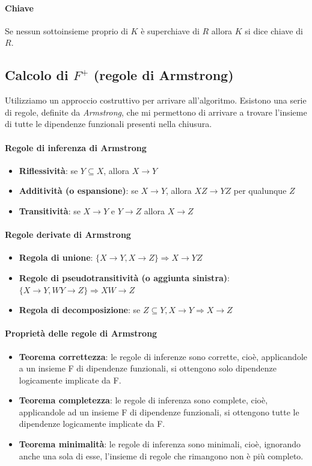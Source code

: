 \paragraph{Chiave} Se nessun sottoinsieme proprio di $K$ è superchiave di $R$ allora $K$ si dice chiave di $R$.
\subsection{Calcolo di $F^{+}$ (regole di Armstrong)}
Utilizziamo un approccio costruttivo per arrivare all'algoritmo. Esistono una serie di regole, definite da \emph{Armstrong}, che mi permettono di arrivare a trovare l'insieme di tutte le dipendenze funzionali presenti nella chiusura.
\paragraph{Regole di inferenza di Armstrong}
\begin{itemize}
	\item \textbf{Riflessività}: se $Y \subseteq X$, allora $X \to Y$
	\item \textbf{Additività (o espansione)}: se $X \to Y$, allora $XZ \to YZ$ per qualunque $Z$
	\item \textbf{Transitività}: se $X \to Y$ e $Y \to Z$ allora $X \to Z$
\end{itemize}
\paragraph{Regole derivate di Armstrong}
\begin{itemize}
	\item \textbf{Regola di unione}: $\{X\to Y, X \to Z\} \Rightarrow X \to YZ$
	\item \textbf{Regole di pseudotransitività (o aggiunta sinistra)}: $\{X\to Y, WY \to Z\} \Rightarrow XW \to Z$
	\item \textbf{Regola di decomposizione}: se $Z \subseteq Y, X \to Y \Rightarrow X \to Z$
\end{itemize}
\paragraph{Proprietà delle regole di Armstrong}
\begin{itemize}
	\item \textbf{Teorema correttezza}: le regole di inferenze sono corrette, cioè, applicandole a un insieme F di dipendenze funzionali, si ottengono solo dipendenze logicamente implicate da F.
	\item \textbf{Teorema completezza}: le regole di inferenza sono complete, cioè, applicandole ad un insieme F di dipendenze funzionali, si ottengono tutte le dipendenze logicamente implicate da F.
	\item \textbf{Teorema minimalità}: le regole di inferenza sono minimali, cioè, ignorando anche una sola di esse, l'insieme di regole che rimangono non è più completo.
\end{itemize}
